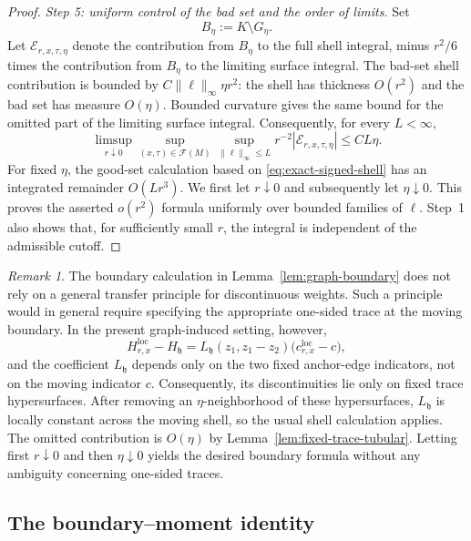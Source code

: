 \documentclass[11pt]{article}
\theoremstyle{remark}
\newtheorem{remark}[theorem]{Remark}
\numberwithin{equation}{section}
\begin{document}
\begin{proof}
\emph{Step 5: uniform control of the bad set and the order of limits.}
Set
\[
B_\eta:=K\setminus G_\eta.
\]
Let $\mathcal E_{r,x,\tau,\eta}$ denote the contribution from $B_\eta$
to the full shell integral, minus $r^2/6$ times the contribution from
$B_\eta$ to the limiting surface integral.
The bad-set shell contribution is bounded by
$C\|\ell\|_\infty\eta r^2$: the shell has thickness $O(r^2)$ and the bad set
has measure $O(\eta)$.  Bounded curvature gives the same bound for the omitted
part of the limiting surface integral.  Consequently, for every $L<\infty$,
\[
\limsup_{r\downarrow0}
\sup_{(x,\tau)\in\mathcal F(M)}
\sup_{\|\ell\|_\infty\le L}
 r^{-2}|\mathcal E_{r,x,\tau,\eta}|\le C L\eta.
\]
For fixed $\eta$, the good-set calculation based on
\eqref{eq:exact-signed-shell} has an integrated remainder
$O(Lr^3)$.  We first let $r\downarrow0$ and subsequently let
$\eta\downarrow0$.  This proves the asserted $o(r^2)$ formula uniformly over
bounded families of $\ell$.  
Step~1 also shows that, for sufficiently small $r$, the integral is independent of the admissible cutoff.
\end{proof}

\begin{remark}
The boundary calculation in Lemma~\ref{lem:graph-boundary} does not rely
on a general transfer principle for discontinuous weights.  Such a principle
would in general require specifying the appropriate one-sided trace at the
moving boundary.
In the present graph-induced setting, however,
\[
H^{\mathrm{loc}}_{r,x}-H_{\mathfrak h}
=
L_{\mathfrak h}(z_1,z_1-z_2)
\bigl(c^{\mathrm{loc}}_{r,x}-c\bigr),
\]
and the coefficient $L_{\mathfrak h}$ depends only on the two fixed
anchor-edge indicators, not on the moving indicator $c$.
Consequently, its discontinuities lie only on fixed trace hypersurfaces.
After removing an $\eta$-neighborhood of these hypersurfaces,
$L_{\mathfrak h}$ is locally constant across the moving shell, so the
usual shell calculation applies.  The omitted contribution is
$O(\eta)$ by Lemma~\ref{lem:fixed-trace-tubular}.
Letting first $r\downarrow0$ and then $\eta\downarrow0$ yields the desired
boundary formula without any ambiguity concerning one-sided traces.
\end{remark}



\subsection{The boundary--moment identity}
\end{document}

